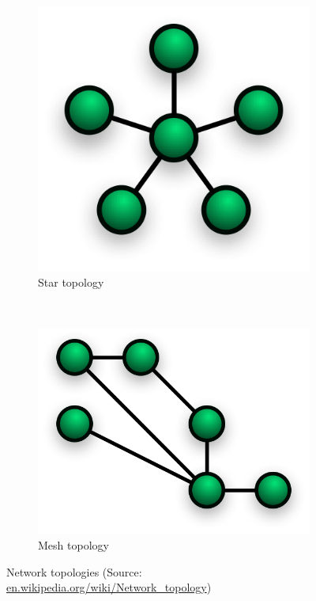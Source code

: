 \begin{figure}
    \centering
    \begin{subfigure}[b]{0.3\textwidth}
      \includegraphics[width=\textwidth]{res/star.png}
      \caption{Star topology}
      \label{fig:star}
    \end{subfigure}
    ~
    \begin{subfigure}[b]{0.3\textwidth}
        \includegraphics[width=\textwidth]{res/mesh.png}
        \caption{Mesh topology}
        \label{fig:mesh}
    \end{subfigure}
    \caption{Network topologies (Source: \url{en.wikipedia.org/wiki/Network_topology})}
    \label{fig:topology}
\end{figure}

